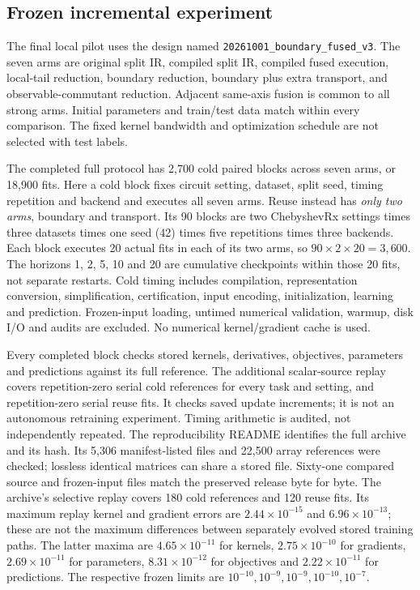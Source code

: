 \subsection{Frozen incremental experiment}
The final local pilot uses the design named
\texttt{20261001\_boundary\_fused\_v3}. The seven arms are original
split IR, compiled split IR, compiled fused execution, local-tail
reduction, boundary reduction, boundary plus extra transport, and
observable-commutant reduction. Adjacent same-axis fusion is common
to all strong arms. Initial parameters and train/test data match
within every comparison. The fixed kernel bandwidth and optimization
schedule are not selected with test labels.

The completed full protocol has 2,700 cold paired blocks across seven
arms, or 18,900 fits. Here a cold block fixes circuit setting, dataset,
split seed, timing repetition and backend and executes all seven arms.
Reuse instead has \emph{only two arms}, boundary and transport.
Its 90 blocks are two ChebyshevRx settings times three datasets times
one seed (42) times five repetitions times three backends. Each block
executes 20 actual fits in each of its two arms, so
$90\times2\times20=3{,}600$. The horizons 1, 2, 5, 10 and 20 are
cumulative checkpoints within those 20 fits, not separate restarts. Cold timing
includes compilation, representation conversion, simplification,
certification, input encoding, initialization, learning and prediction.
Frozen-input loading, untimed numerical validation, warmup, disk I/O
and audits are excluded. No numerical kernel/gradient cache is used.

Every completed block checks stored kernels, derivatives, objectives,
parameters and predictions against its full reference. The additional
scalar-source replay covers repetition-zero serial cold references
for every task and setting, and repetition-zero serial reuse fits.
It checks saved update increments; it is not an autonomous retraining
experiment. Timing arithmetic is audited, not independently repeated.
The reproducibility README identifies the full archive and its hash.
Its 5,306 manifest-listed files and 22,500 array references were checked;
lossless identical matrices can share a stored file. Sixty-one compared
source and frozen-input files match the preserved release byte for byte.
The archive's selective replay covers 180 cold references and 120 reuse
fits. Its maximum replay kernel and gradient errors are
$2.44\times10^{-15}$ and $6.96\times10^{-13}$; these are not the
maximum differences between separately evolved stored training paths.
The latter maxima are $4.65\times10^{-11}$ for kernels,
$2.75\times10^{-10}$ for gradients, $2.69\times10^{-11}$ for
parameters, $8.31\times10^{-12}$ for objectives and
$2.22\times10^{-11}$ for predictions. The respective frozen limits
are $10^{-10},10^{-9},10^{-9},10^{-10},10^{-7}$.

